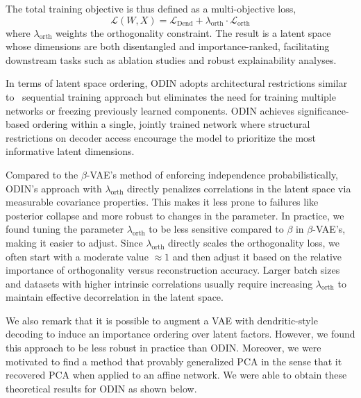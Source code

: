 \documentclass[twoside,11pt]{article}
\begin{document}
The total training objective is thus defined as a multi-objective loss,
\begin{equation}
\mathcal{L}(W,X) = \mathcal{L}_{\text{Dend}}+ \lambda_{\text{orth}} \cdot \mathcal{L}_{\text{orth}}
    \label{eq:total_loss}
\end{equation}
where $\lambda_{\text{orth}}$ weights the orthogonality constraint. The result is a latent space whose dimensions are both disentangled and importance-ranked, facilitating downstream tasks such as ablation studies and robust explainability analyses.

In terms of latent space ordering, ODIN adopts architectural restrictions similar to~\cite{pham2022pca} sequential training approach but eliminates the need for training multiple networks or freezing previously learned components. ODIN achieves significance-based ordering within a single, jointly trained network where structural restrictions on decoder access encourage the model to prioritize the most informative latent dimensions.

Compared to the $\beta$-VAE’s method of enforcing independence probabilistically, ODIN's approach with $\lambda_{\text{orth}}$ directly penalizes correlations in the latent space via measurable covariance properties. This makes it less prone to failures like posterior collapse and more robust to changes in the parameter. In practice, we found tuning the parameter $\lambda_{\text{orth}}$ to be less sensitive compared to $\beta$ in $\beta$-VAE's, making it easier to adjust. Since $\lambda_{\text{orth}}$ directly scales the orthogonality loss, we often start with a moderate value $\approx 1$ and then adjust it based on the relative importance of orthogonality versus reconstruction accuracy. Larger batch sizes and datasets with higher intrinsic correlations usually require increasing $\lambda_{\text{orth}}$ to maintain effective decorrelation in the latent space.

We also remark that it is possible to augment a VAE with dendritic-style decoding to induce an importance ordering over latent factors. However, we found this approach to be less robust in practice than ODIN. Moreover, we were motivated to find a method that provably generalized PCA in the sense that it recovered PCA when applied to an affine network.  We were able to obtain these theoretical results for ODIN as shown below.
\end{document}
